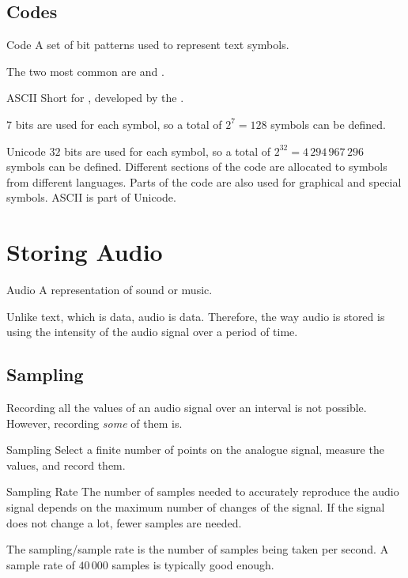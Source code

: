 \documentclass[\main/notes.tex]{subfiles}
\begin{document}
			\subsection{Codes}
				\begin{definition}{Code}
					A set of bit patterns used to represent text symbols.
				\end{definition}
				The two most common  are  and .
				\begin{definition}{ASCII}
					Short for , developed by the .
					\begin{indentparagraph}
						$7$ bits are used for each symbol, so a total of $2^{7} = 128$ symbols can be defined.
					\end{indentparagraph}
				\end{definition}
				\begin{definition}{Unicode}
					$32$ bits are used for each symbol, so a total of $2^{32} = 4 \, 294 \, 967 \, 296$ symbols can be defined. Different sections of the code are allocated to symbols from different languages. Parts of the code are also used for graphical and special symbols. ASCII is part of Unicode.
				\end{definition}
			\pagebreak
		\section{Storing Audio}
			\begin{definition}{Audio}
				A representation of sound or music.
			\end{definition}
			Unlike text, which is  data, audio is  data. Therefore, the way audio is stored is using the intensity of the audio signal over a period of time.
			\subsection{Sampling}
				Recording all the values of an audio signal over an interval is not possible. However, recording \emph{some} of them is.
				\begin{definition}{Sampling}
					Select a finite number of points on the analogue signal, measure the values, and record them.
				\end{definition}
				\begin{definition}{Sampling Rate}
					The number of samples needed to accurately reproduce the audio signal depends on the maximum number of changes of the signal. If the signal does not change a lot, fewer samples are needed.
					\begin{indentparagraph}
						The sampling/sample rate is the number of samples being taken per second. A sample rate of $40 \, 000$ samples is typically good enough.
					\end{indentparagraph}
				\end{definition}
\end{document}
